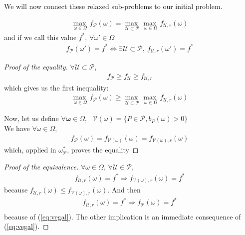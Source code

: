 We will now connect these relaxed sub-problems to our initial problem.\\
\begin{theorem}
\begin{align}
\underset{\omega \in \Omega}{\max~}f_{\mathcal{P}}(\omega) = \underset{\mathcal{U} \subset \mathcal{P}}{\max~} \underset{\omega \in \Omega}{\max~} f_{\mathcal{U},r} (\omega)
\end{align}
and if we call this value $f^*$, $\forall \omega' \in \Omega$
\begin{align}
f_{\mathcal{P}}(\omega') = f^*
\Leftrightarrow
\exists \mathcal{U} \subset \mathcal{P},~ f_{\mathcal{U},r} (\omega') = f^*
\end{align}
\end{theorem}
\begin{proof}[Proof of the equality]
$\forall \mathcal{U} \subset \mathcal{P}$,
\begin{align*}
f_{\mathcal{P}} \geq f_{\mathcal{U}} \geq f_{\mathcal{U},r}
\end{align*}
which gives us the first inequality:
\begin{align*}
\underset{\omega \in \Omega}{\max~}f_{\mathcal{P}}(\omega) \geq \underset{\mathcal{U} \subset \mathcal{P}}{\max~} \underset{\omega \in \Omega}{\max~} f_{\mathcal{U},r} (\omega)
\end{align*}

Now, let us define $\forall \mathbf{\omega} \in \Omega$,~
$\mathcal{V}(\omega) = \{P \in \mathcal{P}, b_P(\omega) >0\}$
\\
We have $\forall \omega \in\Omega$,
\begin{align}
f_{\mathcal{P}}(\omega) = f_{\mathcal{V}(\omega)}(\omega) = f_{\mathcal{V}(\omega),r}(\omega)
\label{eq:vegal}
\end{align}
which, applied in $\omega_{\mathcal{P}}^*$, proves the equality
\end{proof}
\begin{proof}[Proof of the equivalence]
$\forall \omega \in \Omega$, $\forall \mathcal{U} \in \mathcal{P}$,
\begin{align*}
f_{\mathcal{U},r}(\omega) = f^* \Rightarrow
f_{\mathcal{V}(\omega),r}(\omega) = f^*
\end{align*}
because $f_{\mathcal{U},r}(\omega) \leq f_{\mathcal{V}(\omega),r}(\omega)$. And then 
\begin{align*}
f_{\mathcal{U},r}(\omega) = f^* \Rightarrow
f_{\mathcal{P}}(\omega) = f^*\\
\end{align*}
because of (\ref{eq:vegal}). The other implication is an immediate consequence of (\ref{eq:vegal}).
\end{proof}

